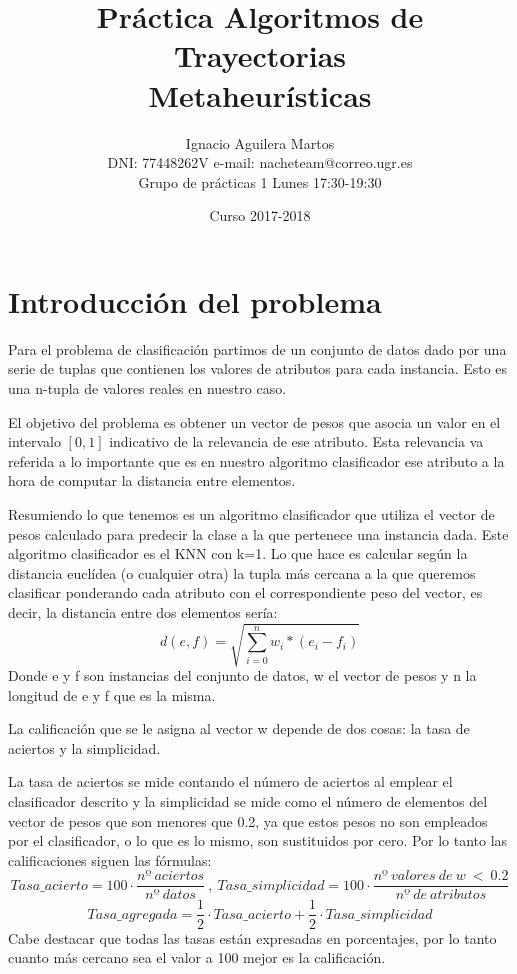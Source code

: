 \documentclass[12pt,a4paper]{article}
\author{Ignacio Aguilera Martos \\
	DNI: 77448262V       e-mail: nacheteam@correo.ugr.es \\
	Grupo de prácticas 1 Lunes 17:30-19:30}
\title{Práctica Algoritmos de Trayectorias \\ Metaheurísticas}
\date{Curso 2017-2018}
\begin{document}
	\maketitle

	\tableofcontents

	\newpage



	\section{Introducción del problema}
	\label{sec:introProblema}

	Para el problema de clasificación partimos de un conjunto de datos dado por una serie de tuplas que contienen los valores de atributos para cada instancia. Esto es una n-tupla de valores reales en nuestro caso.
	
	El objetivo del problema es obtener un vector de pesos que asocia un valor en el intervalo $[0,1]$ indicativo de la relevancia de ese atributo. Esta relevancia va referida a lo importante que es en nuestro algoritmo clasificador ese atributo a la hora de computar la distancia entre elementos.
	
	Resumiendo lo que tenemos es un algoritmo clasificador que utiliza el vector de pesos calculado para predecir la clase a la que pertenece una instancia dada. Este algoritmo clasificador es el KNN con k=1. Lo que hace es calcular según la distancia euclídea (o cualquier otra) la tupla más cercana a la que queremos clasificar ponderando cada atributo con el correspondiente peso del vector, es decir, la distancia entre dos elementos sería:
	$$d(e,f) = \sqrt{\sum_{i=0}^{n}w_i * (e_{i} - f_{i})}$$
	Donde e y f son instancias del conjunto de datos, w el vector de pesos y n la longitud de e y f que es la misma.
	
	La calificación que se le asigna al vector w depende de dos cosas: la tasa de aciertos y la simplicidad.
	
	La tasa de aciertos se mide contando el número de aciertos al emplear el clasificador descrito y la simplicidad se mide como el número de elementos del vector de pesos que son menores que 0.2, ya que estos pesos no son empleados por el clasificador, o lo que es lo mismo, son sustituidos por cero. Por lo tanto las calificaciones siguen las fórmulas:
	$$Tasa\_acierto = 100\cdot \frac{nº  \ aciertos}{nº \ datos} \ , \ Tasa\_simplicidad = 100\cdot \frac{nº \ valores \ de \ w \ < \ 0.2}{nº \ de \ atributos}$$
	$$Tasa\_agregada = \frac{1}{2}\cdot Tasa\_acierto + \frac{1}{2}\cdot Tasa\_simplicidad$$
	Cabe destacar que todas las tasas están expresadas en porcentajes, por lo tanto cuanto más cercano sea el valor a 100 mejor es la calificación.
	
\end{document}
